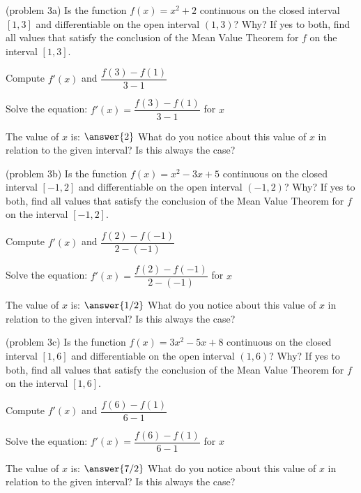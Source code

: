 \documentclass[handout]{ximera}
\begin{document}
\begin{problem}(problem 3a)
  Is the function $f(x) = x^2 + 2$ continuous on the closed interval $[1,3]$ and differentiable on the open interval $(1,3)$? Why?
  If yes to both, find all values that satisfy the conclusion of the Mean Value Theorem for $f$ on the interval $[1,3]$.
	
    \begin{hint}
      Compute $f'(x)$ and $\dfrac{f(3) - f(1)}{3-1}$
    \end{hint}
		\begin{hint}
		  Solve the equation: $f'(x) = \dfrac{f(3) - f(1)}{3-1}$ for $x$
		\end{hint}
		
		The value of $x$ is:
		 $\answer{2}$
     What do you notice about this value of $x$ in relation to the given interval? Is this always the case?
\end{problem}

\begin{problem}(problem 3b)
  Is the function $f(x) = x^2 -3x + 5$ continuous on the closed interval $[-1,2]$ and differentiable on the open interval $(-1,2)$? Why?
  If yes to both, find all values that satisfy the conclusion of the Mean Value Theorem for $f$ on the interval $[-1,2]$.
	
    \begin{hint}
      Compute $f'(x)$ and $\dfrac{f(2) - f(-1)}{2-(-1)}$
    \end{hint}
		\begin{hint}
		  Solve the equation: $f'(x) = \dfrac{f(2) - f(-1)}{2-(-1)}$ for $x$
		\end{hint}
		
		The value of $x$ is:
		 $\answer{1/2}$
 What do you notice about this value of $x$ in relation to the given interval? Is this always the case?
\end{problem}

\begin{problem}(problem 3c)
  Is the function $f(x) = 3x^2 -5x + 8$ continuous on the closed interval $[1,6]$ and differentiable on the open interval $(1,6)$? Why?
  If yes to both, find all values that satisfy the conclusion of the Mean Value Theorem for $f$ on the interval $[1,6]$.
	
    \begin{hint}
      Compute $f'(x)$ and $\dfrac{f(6) - f(1)}{6-1}$
    \end{hint}
		\begin{hint}
		  Solve the equation: $f'(x) = \dfrac{f(6) - f(1)}{6-1}$ for $x$
		\end{hint}
		
		The value of $x$ is:
		 $\answer{7/2}$
     What do you notice about this value of $x$ in relation to the given interval? Is this always the case?
\end{problem}
\end{document}
